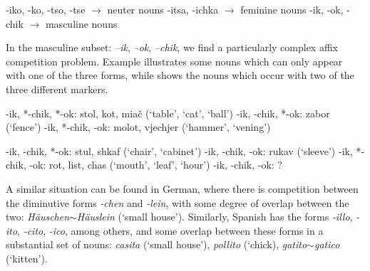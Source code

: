 \begin{exe}
    \ex \label{sys-dim}
    \begin{xlist}
        \ex -iko, -ko, -tso, -tse $\rightarrow$ neuter nouns
        \ex -itsa, -ichka $\rightarrow$ feminine nouns
        \ex -ik, -ok, -chik $\rightarrow$ masculine nouns
    \end{xlist}
\end{exe}

\largerpage
In the masculine subset: \textit{–ik}, \textit{–ok}, \textit{–chik}, we find a particularly complex affix competition problem. Example  illustrates some nouns which can only appear with one of the three forms, while  shows the nouns which occur with two of the three different markers.

\begin{exe}
    \ex \label{ikchikok-single}
    \begin{xlist}
        \ex -ik, *-chik, *-ok: stol, kot, miač (`table', `cat', `ball')
        \ex *-ik, -chik, *-ok: zabor (`fence')
        \ex *-ik, *-chik, -ok: molot, vjechjer (`hammer', `vening')
    \end{xlist}
\end{exe}

\begin{exe}
    \ex \label{ikchikok-multiple}
    \begin{xlist}
        \ex -ik, -chik, *-ok: stul, shkaf (`chair', `cabinet')
        \ex *-ik, -chik, -ok: rukav (`sleeve')
        \ex -ik, *-chik, -ok: rot, list, chas (`mouth', `leaf', `hour')
        \ex -ik, -chik, -ok: ?
    \end{xlist}
\end{exe}

A similar situation can be found in German, where there is competition between the diminutive forms \textit{-chen} and \textit{-lein}, with some degree of overlap between the two: \textit{Häuschen}$\sim$\textit{Häuslein} (`small house'). Similarly, Spanish has the forms \textit{-illo}, \textit{-ito}, \textit{-cito}, \textit{-ico}, among others, and some overlap between these forms in a substantial set of nouns: \textit{casita} (`small house'), \textit{pollito} (`chick), \textit{gatito}$\sim$\textit{gatico} (`kitten').

